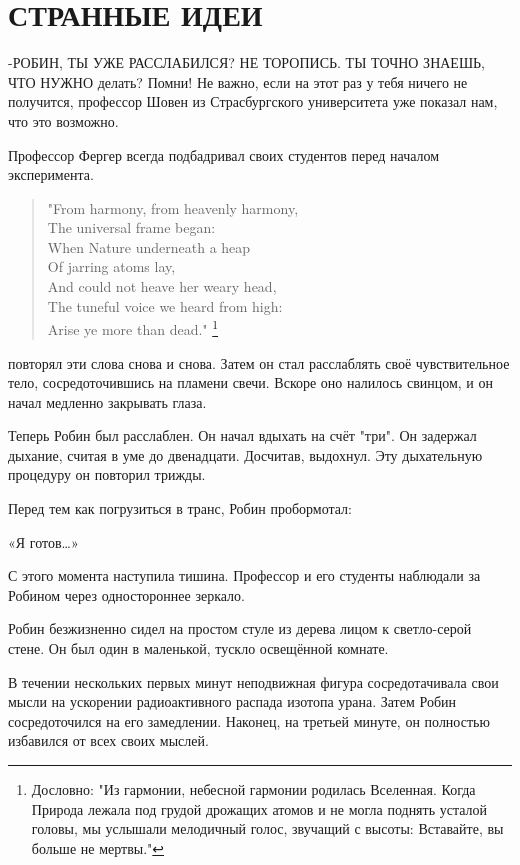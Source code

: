 \documentclass[a4paper,12pt]{book}
\begin{document}
\chapter{СТРАННЫЕ ИДЕИ}
\noindent\par-РОБИН, ТЫ УЖЕ РАССЛАБИЛСЯ? НЕ ТОРОПИСЬ. ТЫ ТОЧНО ЗНАЕШЬ, ЧТО НУЖНО делать? Помни! Не важно, если на этот раз у тебя ничего не получится, профессор Шовен из Страсбургского университета уже показал нам, что это возможно.
\par
Профессор Фергер всегда подбадривал своих студентов перед началом эксперимента.
\begin{quote}
"From harmony, from heavenly harmony,\\
The universal frame began:\\
When Nature underneath a heap\\
Of jarring atoms lay,\\
And could not heave her weary head,\\
The tuneful voice we heard from high:\\
Arise ye more than dead." \footnote{Дословно: "Из гармонии, небесной гармонии родилась Вселенная. Когда Природа лежала под грудой дрожащих атомов и не могла поднять усталой головы, мы услышали мелодичный голос, звучащий с высоты: Вставайте, вы больше не мертвы."}
\end{quote}
 повторял эти слова снова и снова. Затем он стал расслаблять своё чувствительное тело, сосредоточившись на пламени свечи. Вскоре оно налилось свинцом, и он начал медленно закрывать глаза.
\par
Теперь Робин был расслаблен.  Он начал вдыхать на счёт "три". Он задержал дыхание, считая в уме до двенадцати. Досчитав, выдохнул. Эту дыхательную процедуру он повторил трижды.
\par
Перед тем как погрузиться в транс, Робин пробормотал:
\par
«Я готов…»\\
\par
С этого момента наступила тишина. Профессор и его студенты наблюдали за Робином через одностороннее зеркало.\\
\par
Робин безжизненно сидел на простом стуле из дерева лицом к светло-серой стене. Он был один в маленькой, тускло освещённой комнате.
\par
В течении нескольких первых минут неподвижная фигура сосредотачивала свои мысли на ускорении радиоактивного распада изотопа урана. Затем Робин сосредоточился на его замедлении. Наконец, на третьей минуте, он полностью избавился от всех своих мыслей.
\end{document}
